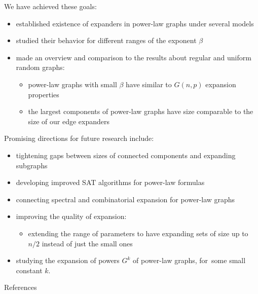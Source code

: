 \documentclass{beamer}
\newcommand{\autotitle}{\secname\ifdefempty{\subsecname}{}{~--- \subsecname}}
\begin{document}
\begin{frame}{\autotitle}
    \small
    We have achieved these goals:
    \begin{itemize}
        \item established existence of expanders in power-law graphs under several models
        \item studied their behavior for different ranges of the exponent $\beta$
        \item made an overview and comparison to the results about regular and uniform random graphs:
        \begin{itemize}
            \item power-law graphs with small $\beta$
            have similar to $G(n,p)$ expansion properties
            \item the largest components of power-law graphs have size comparable
            to the size of our edge expanders
        \end{itemize}
    \end{itemize}
\end{frame}

\begin{frame}{\autotitle}
    \small
    Promising directions for future research include:
    \begin{itemize}
        \item tightening gaps between sizes of connected components and expanding subgraphs
        \item developing improved SAT algorithms for power-law formulas
        \item connecting spectral and combinatorial expansion for power-law graphs
        \item improving the quality of expansion:
        \begin{itemize}
            \item extending the range of parameters to have expanding sets
            of size up to $n/2$ instead of just the small ones
        \end{itemize}
        \item studying the expansion of powers $G^k$ of power-law graphs,
        for~some small constant $k$.
    \end{itemize}
\end{frame}

\appendix
\addtocounter{part}{-1} %

\begin{frame}[allowframebreaks]{References}
    
    
\end{frame}
\end{document}

